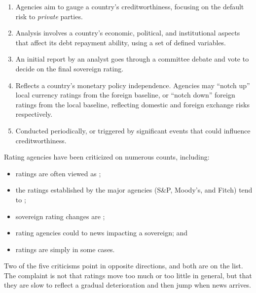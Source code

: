 \begin{enumerate}[label=\alph*)]
\item {} Agencies aim to gauge a country's
creditworthiness, focusing on the default risk to \emph{private} parties.
\item {} Analysis involves a country's economic,
political, and institutional aspects that affect its debt repayment ability,
using a set of defined variables.
\item {} An initial report by an analyst goes through a
committee debate and vote to decide on the final sovereign rating.
\item {} Reflects a country's monetary
policy independence. Agencies may ``notch up'' local currency ratings from the
foreign baseline, or ``notch down'' foreign ratings from the local baseline,
reflecting domestic and foreign exchange risks respectively.
\item {} Conducted periodically, or triggered by significant
events that could influence creditworthiness.
\end{enumerate}


Rating agencies have been criticized on numerous counts, including:

\begin{itemize}
\item ratings are often viewed as ;
\item the ratings established by the major agencies (S\&P, Moody's, and Fitch)
tend to ;
\item sovereign rating changes are ;
\item rating agencies could  to news impacting a sovereign; and
\item ratings are simply  in some cases.
\end{itemize}

\begin{crtrapbox}
Two of the five criticisms point in opposite directions, and both are on the
list. The complaint is not that ratings move too much or too little in general,
but that they are slow to reflect a gradual deterioration and then jump when news
arrives.
\end{crtrapbox}

